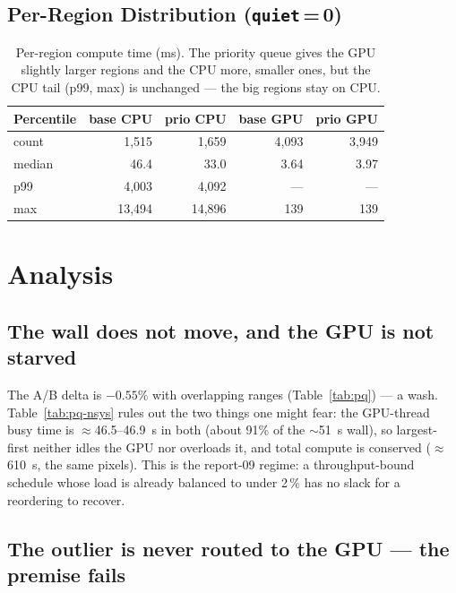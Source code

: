 \documentclass[
	english,
	letterpaper, oneside
]{article}
\begin{document}
\subsection{Per-Region Distribution (\texttt{quiet}\,=\,0)}

\begin{table}[H]
    \centering
    \caption{Per-region compute time (ms). The priority queue gives the GPU
             slightly larger regions and the CPU more, smaller ones, but the
             CPU tail (p99, max) is unchanged --- the big regions stay on CPU.}
    \label{tab:pq-dist}
    \begin{tabular}{lrrrr}
        \hline
        Percentile & base CPU & prio CPU & base GPU & prio GPU \\
        \hline
        count  & 1{,}515 & 1{,}659 & 4{,}093 & 3{,}949 \\
        median & 46.4    & 33.0    & 3.64    & 3.97 \\
        p99    & 4{,}003 & 4{,}092 & ---     & --- \\
        max    & 13{,}494 & 14{,}896 & 139   & 139 \\
        \hline
    \end{tabular}
\end{table}

\section{Analysis}

\subsection{The wall does not move, and the GPU is not starved}

The A/B delta is $-0.55\%$ with overlapping ranges (Table~\ref{tab:pq}) --- a
wash. Table~\ref{tab:pq-nsys} rules out the two things one might fear: the
GPU-thread busy time is $\approx$46.5--46.9~s in both (about 91\% of the
$\sim$51~s wall), so largest-first neither idles the GPU nor overloads it, and
total compute is conserved ($\approx$610~s, the same pixels). This is the
report-09 regime: a throughput-bound schedule whose load is already balanced to
under 2\,\% has no slack for a reordering to recover.

\subsection{The outlier is never routed to the GPU --- the premise fails}
\end{document}
